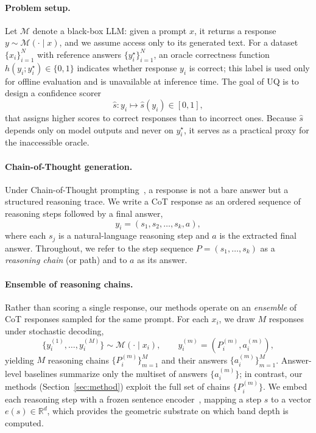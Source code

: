 \documentclass[letterpaper]{article} %
\begin{document}
\paragraph{Problem setup.}
Let $\mathcal{M}$ denote a black-box LLM: given a prompt $x$, it returns a
response $y \sim \mathcal{M}(\cdot \mid x)$, and we assume access only to its
generated text. For a dataset
$\{x_i\}_{i=1}^{N}$ with reference answers $\{y_i^\star\}_{i=1}^{N}$, an oracle
correctness function $h(y_i; y_i^\star) \in \{0, 1\}$ indicates whether response
$y_i$ is correct; this label is used only for offline evaluation and is
unavailable at inference time. The goal of UQ is to design a confidence scorer
\begin{equation}
  \hat{s}: y_i \mapsto \hat{s}(y_i)\in[0,1],
\end{equation}
that assigns higher scores to correct responses than to incorrect ones.
Because $\hat{s}$ depends only on model outputs and never on $y_i^\star$, it
serves as a practical proxy for the inaccessible oracle.

\paragraph{Chain-of-Thought generation.}
Under Chain-of-Thought prompting~\citep{wei2022chain}, a response is not a
bare answer but a structured reasoning trace. We write a CoT response as an
ordered sequence of reasoning steps followed by a final answer,
\begin{equation}
  y_i = (s_1, s_2, \ldots, s_k, a),
\end{equation}
where each $s_j$ is a natural-language reasoning step and $a$ is the extracted
final answer. Throughout, we refer to the step sequence
$P = (s_1, \ldots, s_k)$ as a \emph{reasoning chain} (or path) and to $a$ as its
answer.

\paragraph{Ensemble of reasoning chains.}
Rather than scoring a single response, our methods operate on an \emph{ensemble}
of CoT responses sampled for the same prompt. For each $x_i$, we draw $M$
responses under stochastic decoding,
\begin{equation}
  \{ y_i^{(1)}, \ldots, y_i^{(M)} \} \sim \mathcal{M}(\cdot \mid x_i),
  \qquad
  y_i^{(m)} = (P_i^{(m)}, a_i^{(m)}),
\end{equation}
yielding $M$ reasoning chains $\{P_i^{(m)}\}_{m=1}^{M}$ and their answers
$\{a_i^{(m)}\}_{m=1}^{M}$. Answer-level baselines summarize only the multiset of
answers $\{a_i^{(m)}\}$; in contrast, our methods (Section~\ref{sec:method})
exploit the full set of chains $\{P_i^{(m)}\}$. We embed each reasoning step with
a frozen sentence encoder~\citep{reimers2019sentencebert}, mapping a step $s$ to
a vector $e(s) \in \mathbb{R}^d$, which provides the geometric substrate on
which band depth is computed.
\end{document}
